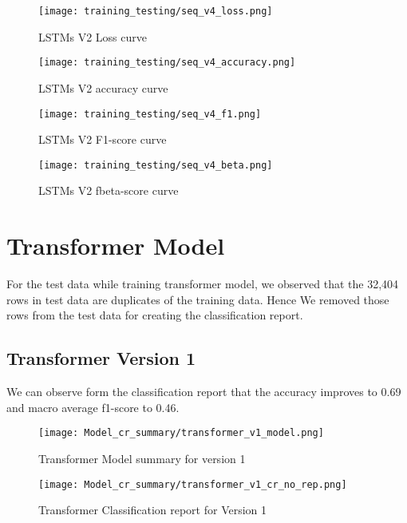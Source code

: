 \begin{figure}[H]
    \centering
    \texttt{[image: training\_testing/seq\_v4\_loss.png]}
    \caption{LSTMs V2 Loss curve}
    \label{fig:LSTMs V2 loss curve}
\end{figure}

\begin{figure}[H]
    \centering
    \texttt{[image: training\_testing/seq\_v4\_accuracy.png]}
    \caption{LSTMs V2 accuracy curve}
    \label{fig:LSTMs V2 accuracy curve}
\end{figure}

\begin{figure}[H]
    \centering
    \texttt{[image: training\_testing/seq\_v4\_f1.png]}
    \caption{LSTMs V2 F1-score curve}
    \label{fig:LSTMs V2 F1-score curve}
\end{figure}

\begin{figure}[H]
    \centering
    \texttt{[image: training\_testing/seq\_v4\_beta.png]}
    \caption{LSTMs V2 fbeta-score curve}
    \label{fig:LSTMs V2 fbeta-score curve}
\end{figure}

\section{Transformer Model}
For the test data while training transformer model, we observed that the 32,404 rows in test data are duplicates of the training data. Hence We removed those rows from the test data for creating the classification report.

\subsection{Transformer Version 1}
We can observe form the classification report that the accuracy improves to 0.69 and macro average f1-score to 0.46.

\begin{figure}[H]
    \centering
    \texttt{[image: Model\_cr\_summary/transformer\_v1\_model.png]}
    \caption{Transformer Model summary for version 1}
    \label{fig:Transformer Model summary for version 1}
\end{figure}

\begin{figure}[H]
    \centering
    \texttt{[image: Model\_cr\_summary/transformer\_v1\_cr\_no\_rep.png]}
    \caption{Transformer Classification report for Version 1}
    \label{fig:Transformer Classification report for Version 1}
\end{figure}

